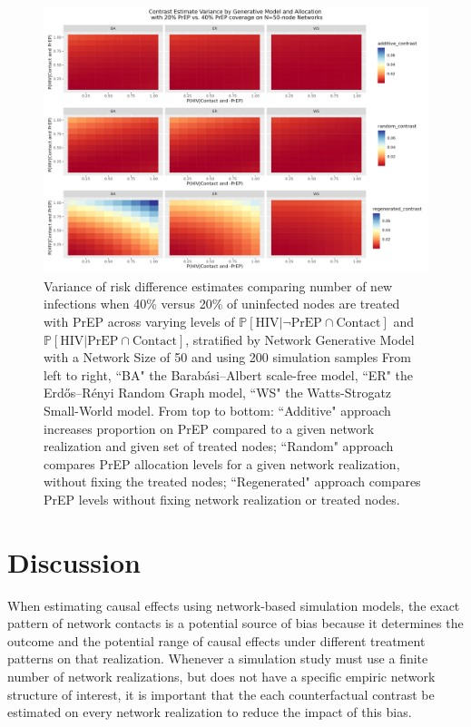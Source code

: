 \documentclass{article}
\theoremstyle{definition}
\begin{document}
\begin{figure}[H]
    \centering
    \includegraphics[width=\linewidth]{Corrected Figures/Generative Model Variance Plot.png}
    \caption{Variance of risk difference estimates comparing number of new infections when 40\% versus 20\% of uninfected nodes are treated with PrEP across varying levels of $\mathbb{P}\left[\text{HIV} \vert \neg \text{PrEP} \cap \text{Contact}\right]$ and $\mathbb{P}\left[\text{HIV} \vert \text{PrEP} \cap \text{Contact}\right]$, stratified by Network Generative Model with a Network Size of 50 and using 200 simulation samples %
    From left to right, ``BA" the Barabási–Albert scale-free model, ``ER" the Erdős–Rényi Random Graph model, ``WS" the Watts-Strogatz Small-World model. From top to bottom: ``Additive" approach increases proportion on PrEP compared to a given network realization and given set of treated nodes; ``Random" approach compares PrEP allocation levels for a given network realization, without fixing the treated nodes; ``Regenerated" approach compares PrEP levels without fixing network realization or treated nodes. 
    }
    \label{fig:Figure 12}
\end{figure}


\section{Discussion}

 When estimating causal effects using network-based simulation models, the exact pattern of network contacts is a potential source of bias because it determines the outcome and the potential range of causal effects under different treatment patterns on that realization. Whenever a simulation study must use a finite number of network realizations, but does not have a specific empiric network structure of interest, it is important that the each counterfactual contrast be estimated on every network realization to reduce the impact of this bias. 
\end{document}
